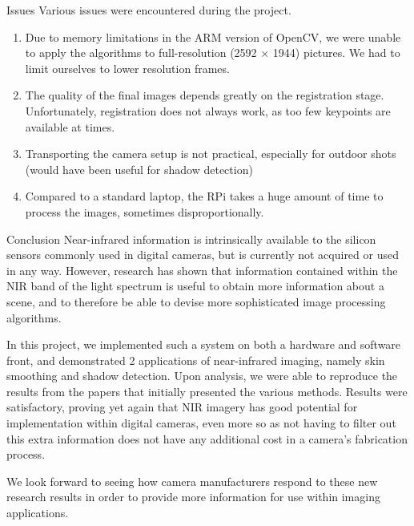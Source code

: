 \documentclass[10pt]{article}
\begin{document}
\begin{section}{Issues}
    Various issues were encountered during the project.
    \begin{enumerate}
        \item Due to memory limitations in the ARM version of OpenCV, we were unable to apply the algorithms to full-resolution (2592 $\times$ 1944) pictures. We had to limit ourselves to lower resolution frames.
        
        \item The quality of the final images depends greatly on the registration stage. Unfortunately, registration does not always work, as too few keypoints are available at times.
        
        \item Transporting the camera setup is not practical, especially for outdoor shots (would have been useful for shadow detection)
        
        \item Compared to a standard laptop, the RPi takes a huge amount of time to process the images, sometimes disproportionally.
    \end{enumerate}
\end{section}

\begin{section}{Conclusion}
    \label{sec:conclusion}
    Near-infrared information is intrinsically available to the silicon sensors commonly used in digital cameras, but is currently not acquired or used in any way. However, research has shown that information contained within the NIR band of the light spectrum is useful to obtain more information about a scene, and to therefore be able to devise more sophisticated image processing algorithms.

    \medskip

    In this project, we implemented such a system on both a hardware and software front, and demonstrated 2 applications of near-infrared imaging, namely skin smoothing and shadow detection. Upon analysis, we were able to reproduce the results from the papers that initially presented the various methods. Results were satisfactory, proving yet again that NIR imagery has good potential for implementation within digital cameras, even more so as not having to filter out this extra information does not have any additional cost in a camera's fabrication process.

    \medskip

    We look forward to seeing how camera manufacturers respond to these new research results in order to provide more information for use within imaging applications.

\end{section}
\end{document}
